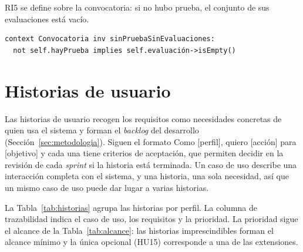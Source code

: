\documentclass[12pt, a4paper, oneside]{report}
\begin{document}
RI5 se define sobre la convocatoria: si no hubo prueba, el conjunto de sus evaluaciones está vacío.

\par\vspace{2ex}\noindent\begin{minipage}{\textwidth}\small{}
\begin{verbatim}
context Convocatoria inv sinPruebaSinEvaluaciones:
  not self.hayPrueba implies self.evaluación->isEmpty()
\end{verbatim}
\end{minipage}\par\vspace{2.5ex}

\FloatBarrier
\section{Historias de usuario}
\label{sec:historias}
Las historias de usuario recogen los requisitos como necesidades concretas de quien usa el sistema y forman el \textit{backlog} del desarrollo (Sección~\ref{sec:metodologia}). Siguen el formato \guillemotleft{}Como [perfil], quiero [acción] para [objetivo]\guillemotright{} y cada una tiene criterios de aceptación, que permiten decidir en la revisión de cada \textit{sprint} si la historia está terminada. Un caso de uso describe una interacción completa con el sistema, y una historia, una sola necesidad, así que un mismo caso de uso puede dar lugar a varias historias.

La Tabla~\ref{tab:historias} agrupa las historias por perfil. La columna de trazabilidad indica el caso de uso, los requisitos y la prioridad. La prioridad sigue el alcance de la Tabla~\ref{tab:alcance}: las historias imprescindibles forman el alcance mínimo y la única opcional (HU15) corresponde a una de las extensiones.
\end{document}
